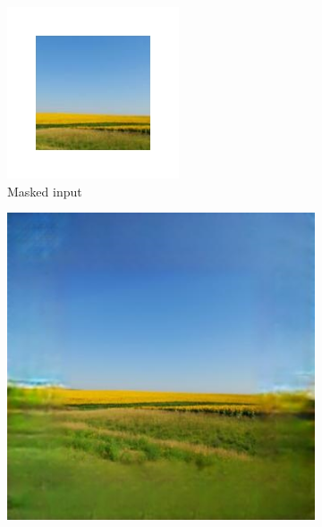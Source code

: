 \documentclass{article}
\begin{document}
\begin{figure}
	\captionsetup[subfigure]{labelformat=empty}
    \centering
    \begin{subfigure}[b]{0.15\textwidth}
        \includegraphics[width=\textwidth]{figs/fig1/masked_input}
        \caption{Masked input}
    \end{subfigure}
    \hfill
    \begin{subfigure}[b]{0.15\textwidth}
        \includegraphics[width=\textwidth]{figs/fig1/baseline}

\end{subfigure}
\end{figure}
\end{document}
